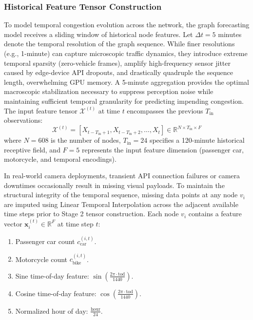 \documentclass[journal,twocolumn]{IEEEtran}
\begin{document}
\subsubsection{Historical Feature Tensor Construction}
To model temporal congestion evolution across the network, the graph forecasting model receives a sliding window of historical node features. Let $\Delta t = 5$ minutes denote the temporal resolution of the graph sequence. While finer resolutions (e.g., 1-minute) can capture microscopic traffic dynamics, they introduce extreme temporal sparsity (zero-vehicle frames), amplify high-frequency sensor jitter caused by edge-device API dropouts, and drastically quadruple the sequence length, overwhelming GPU memory. A 5-minute aggregation provides the optimal macroscopic stabilization necessary to suppress perception noise while maintaining sufficient temporal granularity for predicting impending congestion. The input feature tensor $\mathcal{X}^{(t)}$ at time $t$ encompasses the previous $T_{\text{in}}$ observations:
\begin{equation}
\mathcal{X}^{(t)} = \left[ X_{t-T_{\text{in}}+1}, X_{t-T_{\text{in}}+2}, \dots, X_t \right] \in \mathbb{R}^{N \times T_{\text{in}} \times F}
\end{equation}
where $N = 608$ is the number of nodes, $T_{\text{in}} = 24$ specifies a 120-minute historical receptive field, and $F = 5$ represents the input feature dimension (passenger car, motorcycle, and temporal encodings). 

In real-world camera deployments, transient API connection failures or camera downtimes occasionally result in missing visual payloads. To maintain the structural integrity of the temporal sequence, missing data points at any node $v_i$ are imputed using Linear Temporal Interpolation across the adjacent available time steps prior to Stage 2 tensor construction. Each node $v_i$ contains a feature vector $\mathbf{x}_{i}^{(t)} \in \mathbb{R}^F$ at time step $t$:
\begin{enumerate}
    \item Passenger car count $c_{\text{car}}^{(i,t)}$.
    \item Motorcycle count $c_{\text{bike}}^{(i,t)}$.
    \item Sine time-of-day feature: $\sin\left(\frac{2\pi \cdot \text{tod}}{1440}\right)$.
    \item Cosine time-of-day feature: $\cos\left(\frac{2\pi \cdot \text{tod}}{1440}\right)$.
    \item Normalized hour of day: $\frac{\text{hour}}{24}$.
\end{enumerate}
\end{document}
